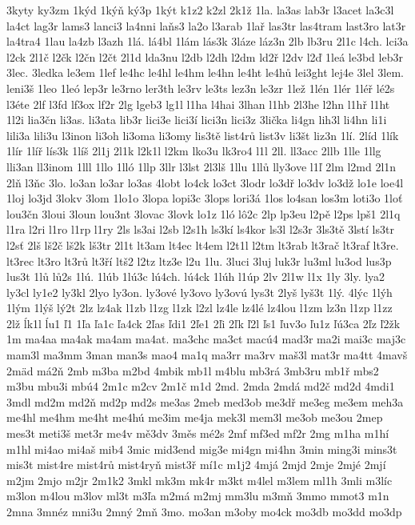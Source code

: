 {3kyty
ky3zm
1kýd
1kýň
ký3p
1kýt
k1z2
k2zl
2k1ž
1la.
la3as
lab3r
l3acet
la3c3l
la4ct
lag3r
lams3
lanci3
la4nni
laňs3
la2o
l3arab
1lař
las3tr
las4tram
last3ro
lat3r
la4tra4
1lau
la4zb
l3azh
1lá.
lá4bl
1lám
lás3k
3láze
láz3n
2lb
lb3ru
2l1c
l4ch.
lci3a
l2ck
2l1č
l2čk
l2čn
l2čt
2l1d
lda3nu
l2db
l2dh
l2dm
ld2ř
l2dv
l2ď
1leá
le3bd
leb3r
3lec.
3ledka
le3em
1lef
le4hc
le4hl
le4hm
le4hn
le4ht
le4hů
lei3ght
lej4e
3lel
3lem.
leni3š
1leo
1leó
lep3r
le3rno
ler3th
le3rv
le3ts
lez3n
le3zr
1lež
1lén
1lér
1léř
lé2s
l3éte
2lf
l3fd
lf3ox
lf2r
2lg
lgeb3
lg1l
l1ha
l4hai
3lhan
l1hb
2l3he
l2hn
l1hř
l1ht
1l2i
lia3čn
li3as.
li3ata
lib3r
lici3e
lici3í
lici3n
lici3z
3lička
li4gn
lih3l
li4hn
li1i
lili3a
lili3u
l3inon
li3oh
li3oma
li3omy
lis3tě
list4rů
list3v
li3št
liz3n
1lí.
2líd
1lík
1lír
1líř
lís3k
1líš
2l1j
2l1k
l2k1l
l2km
lko3u
lk3ro4
l1l
2ll.
ll3acc
2llb
1lle
1llg
lli3an
ll3inom
1lll
1llo
1lló
1llp
3llr
l3lst
2l3lš
1llu
1llů
lly3ove
l1ľ
2lm
l2md
2l1n
2lň
l3ňc
3lo.
lo3an
lo3ar
lo3as
4lobt
lo4ck
lo3ct
3lodr
lo3dř
lo3dv
lo3dž
lo1e
loe4l
1loj
lo3jd
3lokv
3lom
1lo1o
3lopa
lopi3c
3lops
lori3á
1los
lo4san
los3m
loti3o
1loť
lou3čn
3loui
3loun
lou3nt
3lovac
3lovk
lo1z
1ló
lô2c
2lp
lp3eu
l2pě
l2ps
lpš1
2l1q
l1ra
l2ri
l1ro
l1rp
l1ry
2ls
ls3ai
l2sb
l2s1h
ls3kí
ls4kor
ls3l
l2s3r
3ls3tě
3lstí
ls3tr
l2sť
2lš
lš2č
lš2k
lš3tr
2l1t
lt3am
lt4ec
lt4em
l2t1l
l2tm
lt3rab
lt3rač
lt3raf
lt3re.
lt3rec
lt3ro
lt3rů
lt3ří
ltš2
l2tz
ltz3e
l2u
1lu.
3luci
3luj
luk3r
lu3ml
lu3od
lus3p
lus3t
1lů
lů2s
1lú.
1lúb
1lú3c
lú4ch.
lú4ck
1lúh
l1úp
2lv
2l1w
l1x
1ly
3ly.
lya2
ly3cl
ly1e2
ly3kl
2lyo
ly3on.
ly3ové
ly3ovo
ly3ovú
lys3t
2lyš
lyš3t
1lý.
4lýc
1lýh
1lým
1lýš
lý2t
2lz
lz4ak
l1zb
l1zg
l1zk
l2zl
lz4le
lz4lé
lz4lou
l1zm
lz3n
l1zp
l1zz
2lž
ĺk1l
ĺu1
ľ1
1ľa
ľa1c
ľa4ck
2ľas
ľdi1
2ľe1
2ľi
2ľk
ľ2l
ľs1
ľuv3o
ľu1z
ľú3ca
2ľz
ľ2žk
1m
ma4aa
ma4ak
ma4am
ma4at.
ma3chc
ma3ct
macú4
mad3r
ma2i
mai3c
maj3c
mam3l
ma3mm
3man
man3s
mao4
ma1q
ma3rr
ma3rv
maš3l
mat3r
ma4tt
4mavš
2mäd
má2ň
2mb
m3ba
m2bd
4mbik
mb1l
m4blu
mb3rá
3mb3ru
mb1ř
mbs2
m3bu
mbu3i
mbú4
2m1c
m2cv
2m1č
m1d
2md.
2mda
2mdá
md2č
md2d
4mdi1
3mdl
md2m
md2ň
md2p
md2s
me3as
2meb
med3ob
me3dř
me3eg
me3em
meh3a
me4hl
me4hm
me4ht
me4hú
me3im
me4ja
mek3l
mem3l
me3ob
me3ou
2mep
mes3t
meti3š
met3r
me4v
mě3dv
3měs
mé2s
2mf
mf3ed
mf2r
2mg
m1ha
m1hí
m1hl
mi4ao
mi4aš
mib4
3mic
mid3end
mig3e
mi4gn
mi4hn
3min
ming3i
mins3t
mis3t
mist4re
mist4rů
mist4ryň
mist3ř
mí1c
m1j2
4mjá
2mjd
2mje
2mjé
2mjí
m2jm
2mjo
m2jr
2m1k2
3mkl
mk3m
mk4r
m3kt
m4lel
m3lem
ml1h
3mli
m3líc
m3lon
m4lou
m3lov
ml3t
m3ľa
m2má
m2mj
mm3lu
m3mň
3mmo
mmot3
m1n
2mna
3mnéz
mni3u
2mný
2mň
3mo.
mo3an
m3oby
mo4ck
mo3db
mo3dd
mo3dp
}
